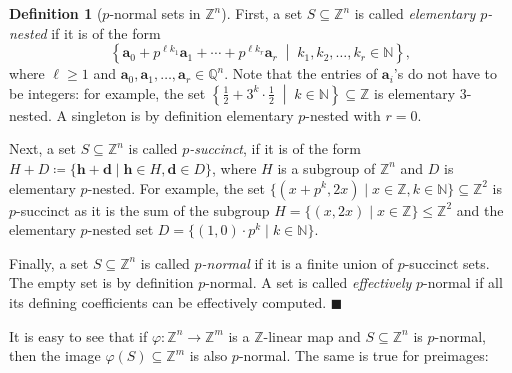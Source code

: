 \documentclass[letterpaper, 11pt, thm-restate]{article}
\numberwithin{equation}{section}
\newcommand{\Z}{\mathbb{Z}}
\newcommand{\N}{\mathbb{N}}
\newcommand{\Q}{\mathbb{Q}}
\newcommand{\ba}{\boldsymbol{a}}
\newcommand{\bb}{\boldsymbol{b}}
\newcommand{\bd}{\boldsymbol{d}}
\newcommand{\bh}{\boldsymbol{h}}
\newtheorem{lemma}[theorem]{Lemma}
\theoremstyle{definition}
\newtheorem{definition}[theorem]{Definition}
\theoremstyle{definition}
\theoremstyle{definition}
\begin{document}
\begin{definition}[$p$-normal sets in $\Z^n$]\label{def:pnormal}
    First, a set $S \subseteq \Z^n$ is called \emph{elementary $p$-nested} if it is of the form
    \begin{equation}\label{eq:pnested_Zn}
    \left\{\ba_0 + p^{\ell k_1} \ba_1 + \cdots + p^{\ell k_r} \ba_r \;\middle|\; k_1, k_2, \ldots, k_r \in \N \right\},
    \end{equation}
    where $\ell \geq 1$ and $\ba_0, \ba_1, \ldots, \ba_r \in \Q^n$.
    Note that the entries of $\ba_i$'s do not have to be integers: for example, the set $\left\{\frac{1}{2} + 3^k \cdot \frac{1}{2}\;\middle|\; k \in \N\right\} \subseteq \Z$ is elementary $3$-nested.
    A singleton is by definition elementary $p$-nested with $r = 0$.

    Next, a set $S \subseteq \Z^n$ is called \emph{$p$-succinct}, if it is of the form $H + D \coloneqq \{\bh + \bd \mid \bh \in H, \bd \in D\}$, where $H$ is a subgroup of $\Z^n$ and $D$ is elementary $p$-nested.
    For example, the set $\{(x+p^{k}, 2x) \mid x \in \Z, k \in \N\} \subseteq \Z^2$ is $p$-succinct as it is the sum of the subgroup $H = \{(x, 2x) \mid x \in \Z\} \leq \Z^2$ and the elementary $p$-nested set $D = \{(1, 0) \cdot p^{k} \mid k \in \N\}$.

    Finally, a set $S \subseteq \Z^n$ is called \emph{$p$-normal} if it is a finite union of $p$-succinct sets.
    The empty set is by definition $p$-normal.
    A set is called \emph{effectively} $p$-normal if all its defining coefficients can be effectively computed.
    \hfill $\blacksquare$
\end{definition}

It is easy to see that if $\varphi \colon \Z^n \rightarrow \Z^m$ is a $\Z$-linear map and $S \subseteq \Z^n$ is $p$-normal, then the image $\varphi(S) \subseteq \Z^m$ is also $p$-normal.
The same is true for preimages:

\end{document}
